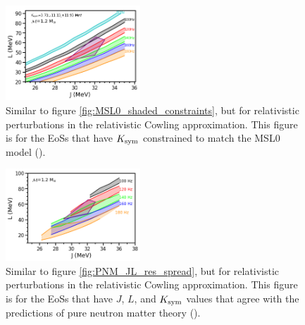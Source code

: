 \documentclass[fleqn,usenatbib]{mnras}
\begin{document}
\begin{figure}
\centering
\includegraphics[width=0.45\textwidth,angle=0]{MSL0_shaded_constraints_rel.png}
\caption{Similar to figure \ref{fig:MSL0_shaded_constraints}, but for relativistic perturbations in the relativistic Cowling approximation. This figure is for the EoSs that have $K_{\rm sym}$ constrained to match the MSL0 model (\citet{chen2010density}).}
\label{fig:MSL0_rel}
\end{figure}

\begin{figure}
\centering
\includegraphics[width=0.45\textwidth,angle=0]{PNM_JL_res_spread_rel.png}
\caption{Similar to figure \ref{fig:PNM_JL_res_spread}, but for relativistic perturbations in the relativistic Cowling approximation. This figure is for the EoSs that have $J$, $L$, and $K_{\rm sym}$ values that agree with the predictions of pure neutron matter theory (\citet{holt2018universal}).}
\label{fig:PNM_rel}
\end{figure}

















\iffalse
\end{document}
